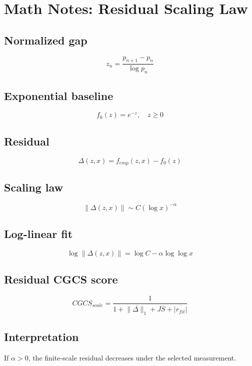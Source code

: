 \documentclass{article}
\begin{document}
\section*{Math Notes: Residual Scaling Law}

\subsection*{Normalized gap}

\[
z_n = \frac{p_{n+1}-p_n}{\log p_n}
\]

\subsection*{Exponential baseline}

\[
f_0(z)=e^{-z}, \quad z\ge 0
\]

\subsection*{Residual}

\[
\Delta(z,x)=f_{emp}(z,x)-f_0(z)
\]

\subsection*{Scaling law}

\[
\|\Delta(z,x)\|\sim C(\log x)^{-\alpha}
\]

\subsection*{Log-linear fit}

\[
\log \|\Delta(z,x)\| = \log C - \alpha \log\log x
\]

\subsection*{Residual CGCS score}

\[
CGCS_{scale} =
\frac{1}{1+\overline{\|\Delta\|_1}+\overline{JS}+\overline{|r_{fit}|}}
\]

\subsection*{Interpretation}

If $\alpha>0$, the finite-scale residual decreases under the selected measurement.
\end{document}
